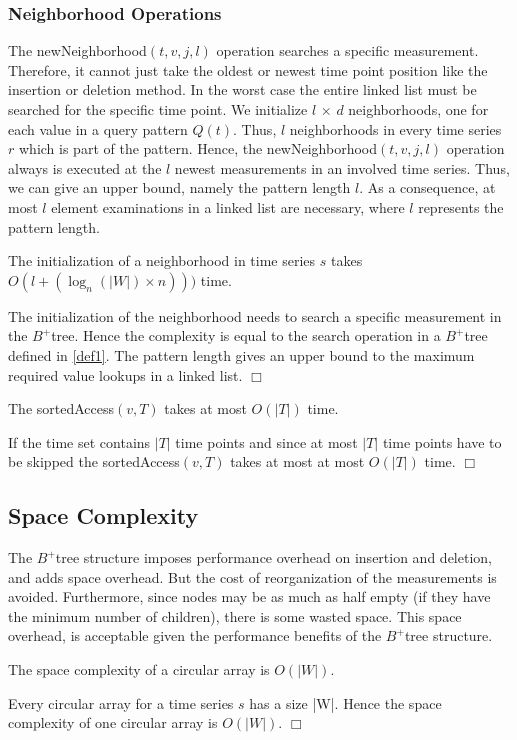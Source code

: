 \documentclass[abstracton,12pt,oneside]{scrreprt}
\newenvironment{proof}
  {\noindent{\bf Proof:\rm}}{\hfill$\Box$\vspace{\medskipamount}}
\begin{document}
\subsubsection{Neighborhood Operations}
 The newNeighborhood$(t,v,j,l)$ operation searches a specific measurement. Therefore, it cannot just take the oldest or newest time point position like the insertion or deletion method. In the worst case the entire linked list must be searched for the specific time point. We initialize $l$ $\times$ $d$ neighborhoods, one for each value in a query pattern $Q(t)$. Thus, $l$ neighborhoods in every time series $r$ which is part of the pattern. Hence, the newNeighborhood$(t,v,j,l)$ operation always is executed at the $l$ newest measurements in an involved time series. Thus, we can give an upper bound, namely the pattern length $l$. As a consequence, at most $l$ element examinations in a linked list are necessary, where $l$ represents the pattern length.
\begin{mydef}
	The initialization of a neighborhood in time series $s$ takes $O(l+(\log_{n}(|W|) \times n)))$ time.
\end{mydef}
\begin{proof}
	The initialization of the neighborhood needs to search a specific measurement in the $B^+$tree. Hence the complexity is equal to the search operation in a $B^+$tree defined in \ref{def1}. The pattern length gives an upper bound to the maximum required value lookups in a linked list.
\end{proof}

\begin{mydef}
	The sortedAccess$(v,T)$ takes at most $O(|T|)$ time.
\end{mydef}
\begin{proof}
	If the time set contains $|T|$ time points and since at most $|T|$ time points have to be skipped the sortedAccess$(v,T)$ takes at most at most $O(|T|)$ time. 
\end{proof}

\subsection{Space Complexity}
The $B^+$tree structure imposes performance overhead on insertion
and deletion, and adds space overhead. But the cost of reorganization of the measurements is avoided. Furthermore,
since nodes may be as much as half empty (if they have the minimum
number of children), there is some wasted space. This space overhead, is
acceptable given the performance benefits of the $B^+$tree structure.
\begin{mydef}
	The space complexity of a circular array is $O(|W|)$.
\end{mydef}
\begin{proof}
	Every circular array for a time series $s$ has a size |W|. Hence the space complexity of one circular array is $O(|W|)$.
\end{proof}
\end{document}
